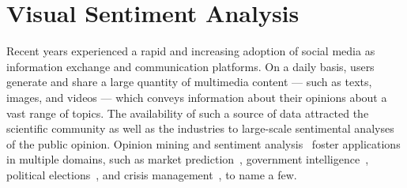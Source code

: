 
\section{Visual Sentiment Analysis}
\label{sec:vsa:introduction}

Recent years experienced a rapid and increasing adoption of social media as information exchange and communication platforms.
On a daily basis, users generate and share a large quantity of multimedia content --- such as texts, images, and videos --- which conveys information about their opinions about a vast range of topics.
The availability of such a source of data attracted the scientific community as well as the industries to large-scale sentimental analyses of the public opinion.
Opinion mining and sentiment analysis~\cite{pang2008opinion} foster applications in multiple domains, such as market prediction~\cite{mishne2006predicting,asur2010predicting}, government intelligence~\cite{abbasi2007affect}, political elections~\cite{laver2003extracting,o2010tweets}, and crisis management~\cite{avvenuti2016impromptu,cresci2015linguistically}, to name a few.

